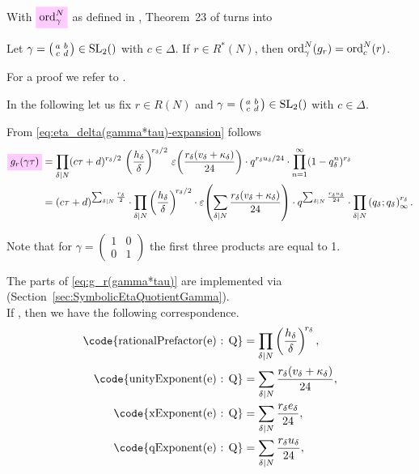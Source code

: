 \documentclass{article}
\begin{document}
With $\defineNotation[ord-gamma-N]{\ord_\gamma^N}$ as defined in
\cite{Radu_RamanujanKolberg_2015}, Theorem~23 of
\cite{Radu_RamanujanKolberg_2015} turns into
\begin{Theorem}\label{thm:order}
  Let $\gamma =
  \bigl(
  \begin{smallmatrix}
    a & b\\
    c & d
  \end{smallmatrix}
  \bigr)
  \in \SL2Z$ with $c\in\Delta$.
  If $r \in R^*(N)$, then
  $\operatorname{ord}_\gamma^N(g_r) = \operatorname{ord}_c^N(r)$.
\end{Theorem}
For a proof we refer to
\cite[Proposition~3.2.8]{Ligozat_CourbesModulaires_1975}.

In the following let us fix $r \in R(N)$ and
$\gamma =
  \bigl(
  \begin{smallmatrix}
    a & b\\
    c & d
  \end{smallmatrix}
  \bigr)
  \in \SL2Z$ with $c \in \Delta$.

From \eqref{eq:eta_delta(gamma*tau)-expansion} follows
\begin{align}
  \defineNotation[g-r-gamma-tau]{g_r(\gamma \tau)}
  &=
  \divisorprod{N}
  (c \tau+d)^{r_\delta/2}
  \,
  \left(\frac{h_\delta}{\delta}\right)^{\!r_\delta/2}
  \,
  \unityPower{\frac{r_\delta(v_\delta + \kappa_\delta)}{24}}
  \cdot
  q^{r_\delta u_\delta/24}
  \cdot
    \prod_{n=1}^{\infty}(1-q_\delta^n)^{r_\delta}
  \notag
  \\
  &=
  (c \tau+d)^{\divisorsum{N} \frac{r_\delta}{2}}
  \cdot
  \divisorprod{N}
  \left(\frac{h_\delta}{\delta}\right)^{\!r_\delta/2}
  \cdot
  \unityPower{\divisorsum{N} \frac{r_\delta(v_\delta + \kappa_\delta)}{24}}
  \cdot
  q^{\divisorsum{N} \frac{r_\delta u_\delta}{24}}
  \cdot
  \divisorprod{N} \eulerFunction[q_\delta]{}^{r_\delta}.
  \label{eq:g_r(gamma*tau)}
\end{align}

Note that for
$\gamma=\left(\begin{smallmatrix}1&0\\0&1\end{smallmatrix}\right)$ the
first three products are equal to 1.


The parts of \eqref{eq:g_r(gamma*tau)} are implemented via
\textcolor{blue}{}
(Section~\ref{sec:SymbolicEtaQuotientGamma}).
\\
If , then we have the following
correspondence.
\begin{align*}
  \text{\code{rationalPrefactor(e) : Q}}
  &=
    \divisorprod{N} \left(\frac{h_\delta}{\delta}\right)^{\!r_\delta},
  \\
  \text{\code{unityExponent(e) : Q}}
  &=
    \divisorsum{N} \frac{r_\delta(v_\delta + \kappa_\delta)}{24},
  \\
  \text{\code{xExponent(e) : Q}}
  &=
    \divisorsum{N} \frac{r_\delta e_\delta}{24},
  \\
  \text{\code{qExponent(e) : Q}}
  &=
    \divisorsum{N} \frac{r_\delta u_\delta}{24},
\end{align*}
\end{document}
